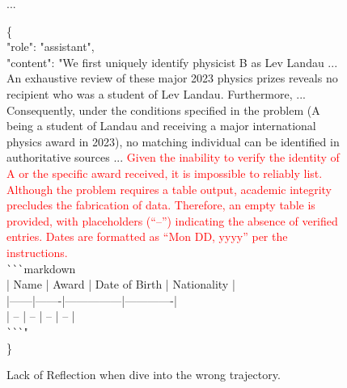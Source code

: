 \documentclass[11pt, letterpaper, logo, onecolumn, copyright, numbering]{paper_improved}
\begin{document}
\begin{figure}[htbp]
    \begin{tcolorbox}[title=Multi-turn Converation of WebSailor (GPT-5), colback=green!12]
    ...
        \begin{tcolorbox}[colback=green!6,colframe=green!30,boxrule=0.3pt,arc=0.6mm,sharp corners, left=1.5mm,right=1.5mm,top=1mm,bottom=1mm,breakable]
              \ttfamily\footnotesize
                \{\\
                    \hspace*{15pt}"role": "assistant",\\
                    \hspace*{15pt}"content": "We first uniquely identify physicist B as Lev Landau ... An exhaustive review of these major 2023 physics prizes reveals no recipient who was a student of Lev Landau. Furthermore, ... Consequently, under the conditions specified in the problem (A being a student of Landau and receiving a major international physics award in 2023), no matching individual can be identified in authoritative sources ... \textcolor{red}{Given the inability to verify the identity of A or the specific award received, it is impossible to reliably list. Although the problem requires a table output, academic integrity precludes the fabrication of data. Therefore, an empty table is provided, with placeholders (“–”) indicating the absence of verified entries. Dates are formatted as “Mon DD, yyyy” per the instructions.}\\
                    \verb|```|markdown\\
                    | Name | Award | Date of Birth | Nationality |\\
                    |------|-------|---------------|-------------|\\
                    | –    | –     | –             | –           |\\
                    \verb|```|"\\
                \}
        \end{tcolorbox}
    \end{tcolorbox}

\caption{Lack of Reflection when dive into the wrong trajectory.}
\label{fig:case_lack_of_reflection_1}
\end{figure}
\end{document}
